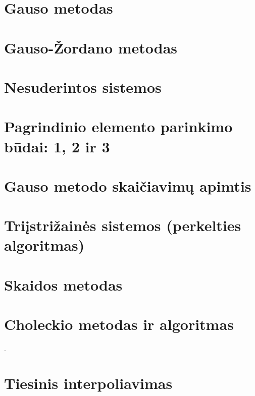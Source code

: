 \section{Gauso metodas}
\cite[60-62]{textbook}
\section{Gauso-Žordano metodas}
\cite[63]{textbook}
\section{Nesuderintos sistemos}
\cite[65]{textbook}
\section{Pagrindinio elemento parinkimo būdai: 1, 2 ir 3}
\cite[66-68]{textbook}
\section{Gauso metodo skaičiavimų apimtis}
\cite[69-70]{textbook}
\section{Triįstrižainės sistemos (perkelties algoritmas)}
\cite[72-73]{textbook}
\section{Skaidos metodas}
\cite[76-78]{textbook}
\section{Choleckio metodas ir algoritmas}
\cite[79-80]{textbook} \cite[81]{textbook}.

\section{Tiesinis interpoliavimas}
\cite[158-163]{textbook}
